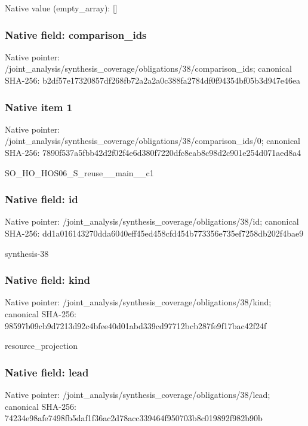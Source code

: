 \documentclass[10pt,a4paper]{article}
\begin{document}
Native value (empty\_\allowbreak{}array): []

\subsubsection{Native field: comparison\_\allowbreak{}ids}
Native pointer: /joint\_\allowbreak{}analysis/synthesis\_\allowbreak{}coverage/obligations/38/comparison\_\allowbreak{}ids; canonical SHA-256: b2df57e17320857df268fb72a2a2a0c388fa2784df0f94354bf05b3d947e46ea

\subsubsection{Native item 1}
Native pointer: /joint\_\allowbreak{}analysis/synthesis\_\allowbreak{}coverage/obligations/38/comparison\_\allowbreak{}ids/0; canonical SHA-256: 7890f537a5fbb42d2f02f4e6d380f7220dfc8eab8c98d2c901e254d071aed8a4

\begingroup\raggedright\sloppy SO\_\allowbreak{}HO\_\allowbreak{}HOS06\_\allowbreak{}S\_\allowbreak{}reuse\_\allowbreak{}\_\allowbreak{}main\_\allowbreak{}\_\allowbreak{}c1\par\endgroup

\subsubsection{Native field: id}
Native pointer: /joint\_\allowbreak{}analysis/synthesis\_\allowbreak{}coverage/obligations/38/id; canonical SHA-256: dd1a016143270dda6040eff45ed458cfd454b773356e735ef7258db202f4bae9

\begingroup\raggedright\sloppy synthesis-38\par\endgroup

\subsubsection{Native field: kind}
Native pointer: /joint\_\allowbreak{}analysis/synthesis\_\allowbreak{}coverage/obligations/38/kind; canonical SHA-256: 98597b09cb9d7213d92c4bfee40d01abd339cd97712bcb287fe9f17bac42f24f

\begingroup\raggedright\sloppy resource\_\allowbreak{}projection\par\endgroup

\subsubsection{Native field: lead}
Native pointer: /joint\_\allowbreak{}analysis/synthesis\_\allowbreak{}coverage/obligations/38/lead; canonical SHA-256: 74234e98afe7498fb5daf1f36ac2d78acc339464f950703b8c019892f982b90b
\end{document}
